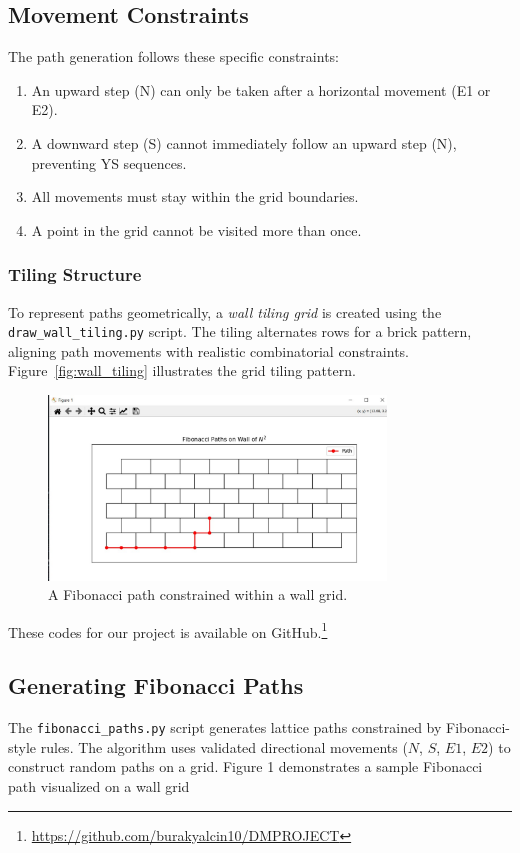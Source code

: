 \documentclass{article}
\begin{document}
\subsection{Movement Constraints}
The path generation follows these specific constraints:
\begin{enumerate}
    \item An upward step (N) can only be taken after a horizontal movement (E1 or E2).
    \item A downward step (S) cannot immediately follow an upward step (N), preventing YS sequences.
    \item All movements must stay within the grid boundaries.
    \item A point in the grid cannot be visited more than once.
\end{enumerate}

\subsubsection{Tiling Structure}
To represent paths geometrically, a \textit{wall tiling grid} is created using the \texttt{draw\_wall\_tiling.py} script. The tiling alternates rows for a brick pattern, aligning path movements with realistic combinatorial constraints. Figure~\ref{fig:wall_tiling} illustrates the grid tiling pattern.

\begin{figure}[h]
    \centering
    \includegraphics[width=0.8\textwidth]{images/fibonacci.jpg}
    \caption{A Fibonacci path constrained within a wall grid.}
    \label{fig:fibonacci_path}
\end{figure}

These codes for our project is available on GitHub.\footnote{\url{https://github.com/burakyalcin10/DMPROJECT}}

\subsection{Generating Fibonacci Paths}
The \texttt{fibonacci\_paths.py} script generates lattice paths constrained by Fibonacci-style rules. The algorithm uses validated directional movements ($N$, $S$, $E1$, $E2$) to construct random paths on a grid. Figure 1 demonstrates a sample Fibonacci path visualized on a wall grid
\end{document}
